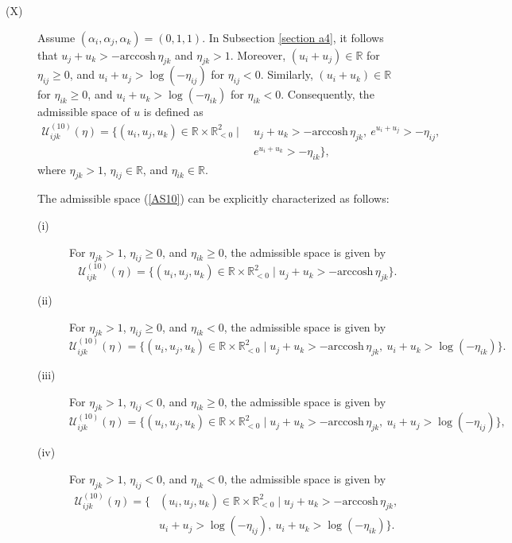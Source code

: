 \documentclass[12pt]{amsart}
\theoremstyle{definition}
\begin{document}
\begin{description}
\item[(X)]
Assume $(\alpha_i,\alpha_j,\alpha_k)=(0,1,1)$.
In Subsection \ref{section a4}, it follows that $u_j+u_k>-\mathrm{arccosh}\, \eta_{jk}$ and $\eta_{jk}>1$.
Moreover, $(u_i+u_j)\in \mathbb{R}$ for $\eta_{ij}\geq0$, and $u_i+u_j>\log(-\eta_{ij})$ for $\eta_{ij}<0$.
Similarly, $(u_i+u_k)\in \mathbb{R}$ for $\eta_{ik}\geq0$, and $u_i+u_k>\log(-\eta_{ik})$ for $\eta_{ik}<0$.
Consequently, the admissible space of $u$ is defined as
\begin{equation}\label{AS10}
\begin{aligned}
\mathcal{U}^{(10)}_{ijk}(\eta)
=\{(u_i,u_j,u_k)\in \mathbb{R}\times\mathbb{R}^2_{<0}
\mid &\ u_j+u_k>-\mathrm{arccosh}\, \eta_{jk},\ e^{u_i+u_j}>-\eta_{ij},\\
&\ e^{u_i+u_k}>-\eta_{ik} \},
\end{aligned}
\end{equation}
where $\eta_{jk}>1$, $\eta_{ij}\in \mathbb{R}$, and $\eta_{ik}\in \mathbb{R}$.

The admissible space (\ref{AS10}) can be explicitly characterized as follows:
\begin{description}
\item[(i)]For $\eta_{jk}>1$, $\eta_{ij}\geq0$, and $\eta_{ik}\geq0$, the admissible space is given by
\begin{equation*}
\mathcal{U}^{(10)}_{ijk}(\eta)
=\{(u_i,u_j,u_k)\in \mathbb{R}\times\mathbb{R}^2_{<0}
\mid u_j+u_k>-\mathrm{arccosh}\, \eta_{jk} \}.
\end{equation*}
\item[(ii)]For $\eta_{jk}>1$, $\eta_{ij}\geq0$, and $\eta_{ik}<0$, the admissible space is given by
\begin{equation*}
\mathcal{U}^{(10)}_{ijk}(\eta)
=\{(u_i,u_j,u_k)\in \mathbb{R}\times\mathbb{R}^2_{<0}
\mid u_j+u_k>-\mathrm{arccosh}\,  \eta_{jk},\ u_i+u_k>\log(-\eta_{ik}) \}.
\end{equation*}
\item[(iii)]For $\eta_{jk}>1$, $\eta_{ij}<0$, and $\eta_{ik}\geq0$, the admissible space is given by
\begin{equation*}
\mathcal{U}^{(10)}_{ijk}(\eta)
=\{(u_i,u_j,u_k)\in \mathbb{R}\times\mathbb{R}^2_{<0}
\mid u_j+u_k>-\mathrm{arccosh}\,  \eta_{jk},\ u_i+u_j>\log(-\eta_{ij}) \},
\end{equation*}
\item[(iv)]For $\eta_{jk}>1$, $\eta_{ij}<0$, and $\eta_{ik}<0$, the admissible space is given by
\begin{equation*}
\begin{aligned}
\mathcal{U}^{(10)}_{ijk}(\eta)
=\{&(u_i,u_j,u_k)\in \mathbb{R}\times\mathbb{R}^2_{<0}
\mid u_j+u_k>-\mathrm{arccosh}\,\eta_{jk},\ \\ &u_i+u_j>\log(-\eta_{ij}),\ u_i+u_k>\log(-\eta_{ik}) \}.
\end{aligned}
\end{equation*}
\end{description}


\end{description}
\end{document}
